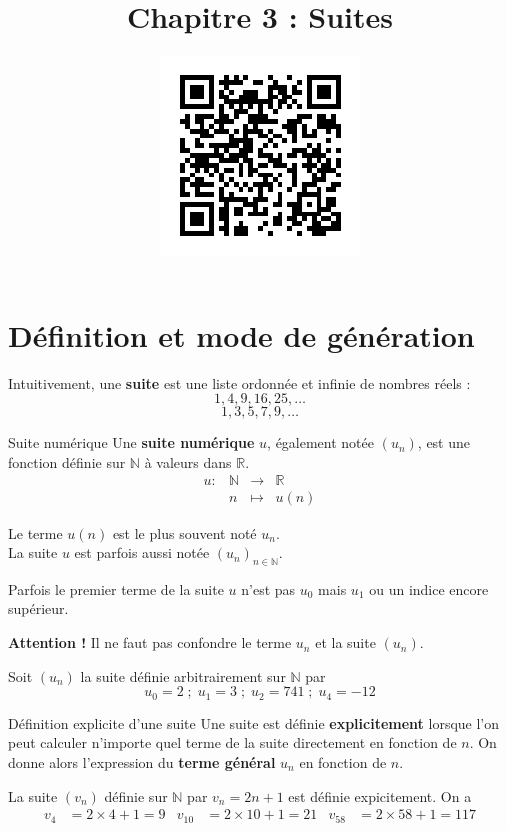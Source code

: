 \documentclass[11pt]{article}
\title{\vspace{-15mm}Chapitre 3 : Suites}
\date{\vspace{-14mm}
\href{https://erou.forge.aeif.fr/spe-1e/suites.html}{
  \includegraphics[scale=.8]{qr-suites.png}}
\vspace{-10mm}}
\author{}
\begin{document}
\maketitle\thispagestyle{fancy}

\section{Définition et mode de génération}
\noindent Intuitivement, une \textbf{suite} est une liste ordonnée et infinie de nombres
réels :
\[
  1, 4, 9, 16, 25, \dots
\]
\[
  1, 3, 5, 7, 9, \dots
\]
\begin{defi}{Suite numérique}
  Une \textbf{suite numérique} $u$, également notée
  $(u_n)$, est une fonction définie sur $\mathbb{N}$ à valeurs dans $\mathbb{R}$.
  \[
  \begin{array}{cccc}
    u: & \mathbb{N} & \to & \mathbb{R} \\
    & n & \mapsto & u(n)
  \end{array}
\]
\end{defi}
\begin{notation}
  Le terme $u(n)$ est le plus souvent noté $u_n$.\\
  La suite $u$ est parfois aussi notée $(u_n)_{n\in\mathbb{N}}$.
\end{notation}

\begin{rmq}
  Parfois le premier terme de la suite $u$ n'est pas $u_0$ mais $u_1$ ou un
  indice encore supérieur.
\end{rmq}
\begin{rmq}
  \textbf{Attention !} Il ne faut pas confondre le terme $u_n$ et la suite
  $(u_n)$.
\end{rmq}

\begin{exemple}
  Soit $(u_n)$ la suite définie arbitrairement sur $\mathbb{N}$ par
  \[
    u_0 = 2
    \;;\;
    u_1 = 3
    \;;\;
    u_2 = 741
    \;;\;
    u_4 = -12 
  \]
\end{exemple}
\begin{defi}{Définition explicite d'une suite}
  Une suite est définie \textbf{explicitement} lorsque l'on peut calculer
  n'importe quel terme de la suite directement en fonction de $n$. On donne
  alors l'expression du \textbf{terme général} $u_n$ en fonction de $n$.
\end{defi}
\begin{exemple}
  La suite $(v_n)$ définie sur $\mathbb{N}$ par $v_n=2n+1$ est définie
  expicitement. On a 
  \begin{align*}
    v_4 &= 2 \times 4+1 = 9 &
    v_{10} &= 2 \times 10 +1 = 21 &
    v_{58} &= 2 \times 58 +1 = 117
  \end{align*}
\end{exemple}
\end{document}
